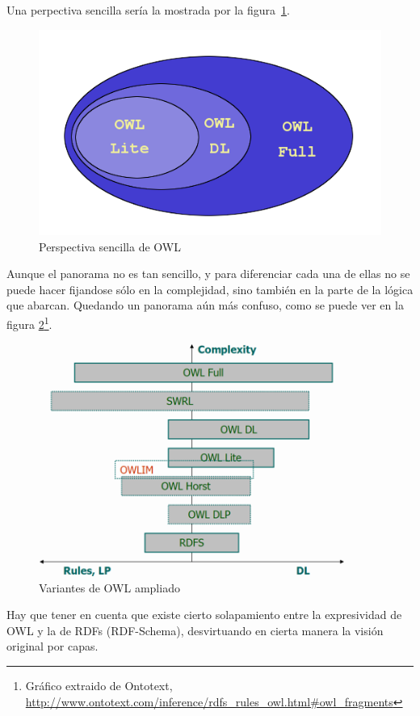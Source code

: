 Una perpectiva sencilla sería la mostrada por la figura~\ref{fig:owlVariants}.

\begin{figure}[H]
	\centering
	\includegraphics[width=12cm]{images/owl-variants.png}
	\caption{Perspectiva sencilla de OWL}
	\label{fig:owlVariants}
\end{figure}

Aunque el panorama no es tan sencillo, y para diferenciar cada una de ellas no
se puede hacer fijandose sólo en la complejidad, sino también en la parte de la 
lógica que abarcan. Quedando un panorama aún más confuso, como se puede ver en 
la figura \ref{fig:owlVariantsExtended}\footnote{Gráfico extraido de Ontotext, 
\url{http://www.ontotext.com/inference/rdfs_rules_owl.html#owl_fragments}}.

\begin{figure}[H]
	\centering
	\includegraphics[width=10cm]{images/owl-dialects.png}
	\caption{Variantes de OWL ampliado}
	\label{fig:owlVariantsExtended}
\end{figure}

Hay que tener en cuenta que existe cierto solapamiento entre la expresividad de
OWL y la de RDFs (RDF-Schema), desvirtuando en cierta manera la visión original
por capas.

